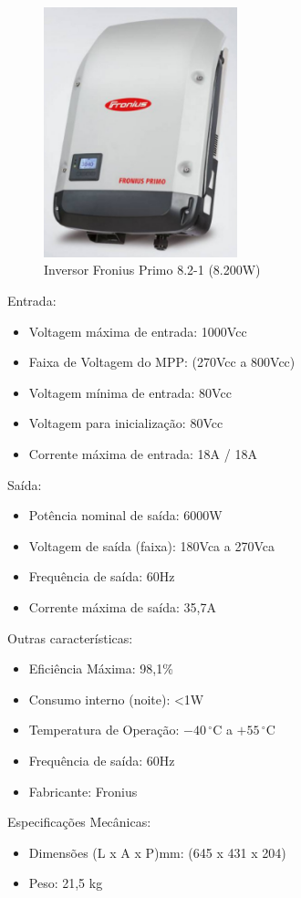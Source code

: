 \begin{figure}[h]
\centering
\includegraphics[width=0.5\textwidth]{figuras/inversor.PNG}
\caption{Inversor Fronius Primo 8.2-1 (8.200W)}
\end{figure}
Entrada:
\begin{itemize}
\item Voltagem máxima de entrada: 1000Vcc
\item Faixa de Voltagem do MPP: (270Vcc a 800Vcc)
\item Voltagem mínima de entrada: 80Vcc
\item Voltagem para inicialização: 80Vcc
\item Corrente máxima de entrada: 18A / 18A
\end{itemize}
Saída:
\begin{itemize}
\item Potência nominal de saída: 6000W
\item Voltagem de saída (faixa): 180Vca a 270Vca
\item Frequência de saída: 60Hz
\item Corrente máxima de saída: 35,7A
\end{itemize}
Outras características:
\begin{itemize}
\item Eficiência Máxima: 98,1\%
\item Consumo interno (noite): <1W
\item Temperatura de Operação: $-40\,^{\circ}\mathrm{C}$ a $+55\,^{\circ}\mathrm{C}$
\item Frequência de saída: 60Hz
\item Fabricante: Fronius
\end{itemize}
Especificações Mecânicas:
\begin{itemize}
\item Dimensões (L x A x P)mm: (645 x 431 x 204)
\item Peso: 21,5 kg
\end{itemize}

